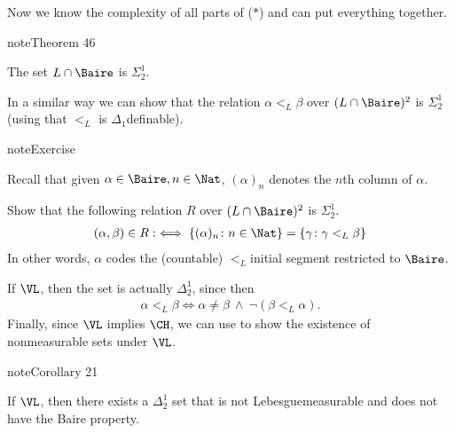 \documentclass[letterpaper,10pt,english]{jupyterBook}
\begin{document}
\sphinxAtStartPar
Now we know the complexity of all parts of (\(*\)) and can put everything together.
\label{constructible-reals:thm-L-reals}
\begin{sphinxadmonition}{note}{Theorem 46}



\sphinxAtStartPar
The set \(L \cap \Baire\) is \(\Sigma^1_2\).
\end{sphinxadmonition}

\sphinxAtStartPar
In a similar way we can show that the relation \(\alpha <_L \beta\) over \((L\cap\Baire)^2\) is \(\Sigma^1_2\) (using that \(<_L\) is \(\Delta_1\)\sphinxhyphen{}definable).

\begin{sphinxadmonition}{note}{Exercise}

\sphinxAtStartPar
Recall that given \(\alpha \in \Baire, n \in \Nat\), \((\alpha)_n\) denotes the \(n\)\sphinxhyphen{}th column of \(\alpha\).

\sphinxAtStartPar
Show that the following relation \(R\) over \((L\cap\Baire)^2\) is \(\Sigma^1_2\).
\begin{equation*}
\begin{split}
(\alpha, \beta) \in R :\iff \{(\alpha)_n\colon n \in \Nat \} = \{\gamma \colon \gamma <_L \beta \}
\end{split}
\end{equation*}
\sphinxAtStartPar
In other words, \(\alpha\) codes the (countable) \(<_L\)\sphinxhyphen{}initial segment restricted to \(\Baire\).
\end{sphinxadmonition}

\sphinxAtStartPar
If \(\VL\), then the set is actually \(\Delta^1_2\), since then
\begin{equation*}
\begin{split}
	\alpha <_L \beta \iff \alpha \neq \beta \: \wedge \: \neg(\beta <_L \alpha).
\end{split}
\end{equation*}
\sphinxAtStartPar
Finally, since \(\VL\) implies \(\CH\), we can use {\hyperref[\detokenize{projective:prop-non-meas}]{}} to show the existence of non\sphinxhyphen{}measurable sets under \(\VL\).
\label{constructible-reals:cor-L-reals}
\begin{sphinxadmonition}{note}{Corollary 21}



\sphinxAtStartPar
If \(\VL\), then there exists a \(\Delta^1_2\) set that is not Lebesgue\sphinxhyphen{}measurable and does not have the Baire property.
\end{sphinxadmonition}
\end{document}
